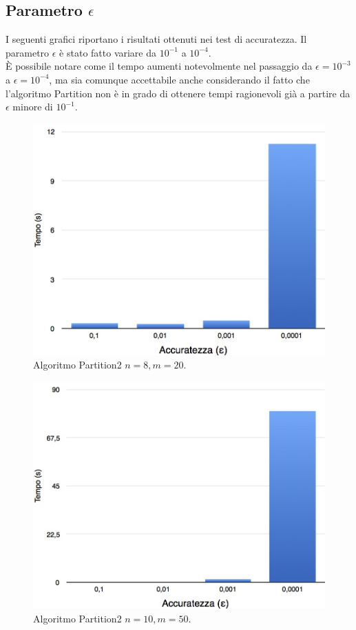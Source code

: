 \subsection{Parametro $\epsilon$}
I seguenti grafici riportano i risultati ottenuti nei test di accuratezza. Il parametro $\epsilon$ è stato fatto variare da $10^{-1}$ a $10^{-4}$.\\
È possibile notare come il tempo aumenti notevolmente nel passaggio da $\epsilon = 10^{-3}$ a $\epsilon = 10^{-4}$, ma sia comunque accettabile anche considerando il fatto che l'algoritmo Partition non è in grado di ottenere tempi ragionevoli già a partire da $\epsilon$ minore di $10^{-1}$.
\begin{figure}[!htb]
	\vspace*{1cm}
	\centering
	\includegraphics[scale=.3]{img/eps/8.jpg}
	\caption{Algoritmo Partition2 $n = 8, m = 20$.}
\end{figure}
\begin{figure}[!htb]
	\vspace*{1cm}
	\centering
	\includegraphics[scale=.3]{img/eps/10.jpg}
	\caption{Algoritmo Partition2 $n = 10, m = 50$.}
\end{figure}
